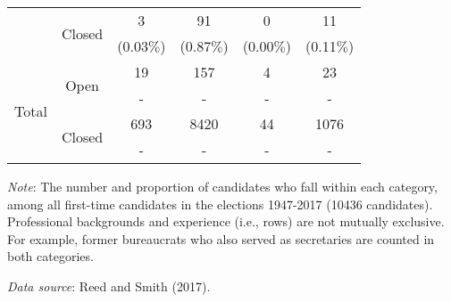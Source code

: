 \begin{table}[H]
\begin{threeparttable}
\begin{tabular}{cccccc}
    & \multirow{2}{*}{Closed} & 3 & 91 & 0 & 11 \\
    & & (0.03$\%$) & (0.87$\%$) & (0.00$\%$) & (0.11$\%$) \\ \midrule[0.7pt]
    \multirow{4}{*}{Total} & \multirow{2}{*}{Open} & 19 & 157 & 4 & 23 \\
    & & - & - & - & - \\ 
    & \multirow{2}{*}{Closed} & 693 & 8420 & 44 & 1076 \\
    & & - & - & - & - \\ \bottomrule
  \end{tabular}
  \begin{tablenotes}[flushleft]
    \scriptsize{
      \item \textit{Note}: The number and proportion of candidates who fall within each category, among all first-time candidates in the elections 1947-2017 (10436 candidates). Professional backgrounds and experience (i.e., rows) are not mutually exclusive. For example, former bureaucrats who also served as secretaries are counted in both categories.
      \item \textit{Data source}: Reed and Smith (2017).
    }
  \end{tablenotes}
\end{threeparttable}
\end{table}

